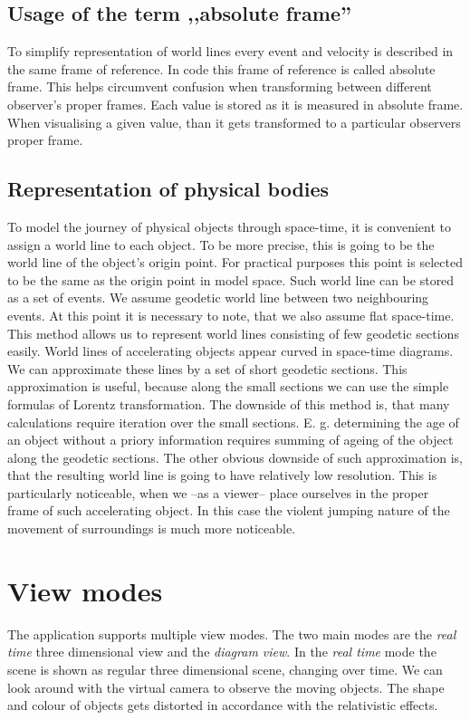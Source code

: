 \documentclass{egpubl}
\begin{document}
\subsection{Usage of the term ,,absolute frame''}
To simplify representation of world lines every event and velocity is described in the same frame of reference. In code this frame of reference is called absolute frame. This helps circumvent confusion when transforming between different observer's proper frames. Each value is stored as it is measured in absolute frame. When visualising a given value, than it gets transformed to a particular observers proper frame.

\subsection{Representation of physical bodies}
To model the journey of physical objects through space-time, it is convenient to assign a world line to each object. To be more precise, this is going to be the world line of the object's origin point. For practical purposes this point is selected to be the same as the origin point in model space. Such world line can be stored as a set of events. We assume geodetic world line between two neighbouring events. At this point it is necessary to note, that we also assume flat space-time. This method allows us to represent world lines consisting of few geodetic sections easily. World lines of accelerating objects appear curved in space-time diagrams. We can approximate these lines by a set of short geodetic sections. This approximation is useful, because along the small sections we can use the simple formulas of Lorentz transformation. The downside of this method is, that many calculations require iteration over the small sections. E. g. determining the age of an object without a priory information requires summing of ageing of the object along the geodetic sections. The other obvious downside of such approximation is, that the resulting world line is going to have relatively low resolution. This is particularly noticeable, when we --as a viewer-- place ourselves in the proper frame of such accelerating object. In this case the violent jumping nature of the movement of surroundings is much more noticeable.

\section{View modes}
The application supports multiple view modes. The two main modes are the \emph{real time} three dimensional view and the \emph{diagram view}. In the \emph{real time} mode the scene is shown as regular three dimensional scene, changing over time. We can look around with the virtual camera to observe the moving objects. The shape and colour of objects gets distorted in accordance with the relativistic effects. 
\end{document}
